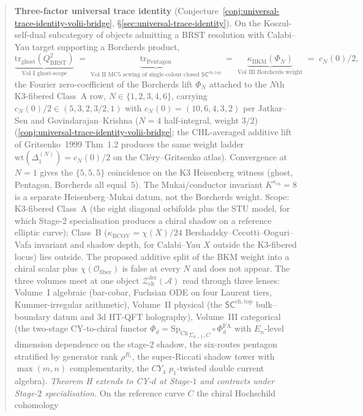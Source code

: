 \documentclass[11pt]{memoir}
\providecommand{\PhiFA}{\Phi^{\mathrm{FA}}}
\providecommand{\SpCh}{\mathrm{Sp}_{\mathrm{Ch}}}
\providecommand{\cref}[1]{\ref{#1}}
\newcommand{\cO}{\mathcal{O}}
\newcommand{\cA}{\mathcal{A}}
\providecommand{\cZ}{\mathcal{Z}}
\newcommand{\SCchtop}{{\mathsf{SC}^{\mathrm{ch,top}}}}
\providecommand{\PhiFA}{\Phi^{\mathrm{FA}}}
\providecommand{\SpCh}{\mathrm{Sp}^{\mathrm{ch}}}
\begin{document}
\begin{abstract}
\textbf{Three-factor universal trace identity}
(Conjecture~\ref{conj:universal-trace-identity-volii-bridge},
\S\ref{sec:universal-trace-identity}). On the Koszul-self-dual
subcategory of objects admitting a BRST resolution with
Calabi--Yau target supporting a Borcherds product,
\[
 \underbrace{\mathrm{tr}_{\mathrm{ghost}}(Q_{\mathrm{BRST}}^2)}_{\text{Vol~I ghost-scope}}
 \;=\;\underbrace{\mathrm{tr}_{\mathrm{Pentagon}}}_{\text{Vol~II MC5 sewing of single-colour closed $\SCchtop$}}
 \;=\;\underbrace{\kappa_{\mathrm{BKM}}(\Phi_N)}_{\text{Vol~III Borcherds weight}}
 \;=\;c_N(0)/2,
\]
the Fourier zero-coefficient of the Borcherds lift $\Phi_N$
attached to the $N$th K3-fibered Class~A row, $N \in \{1, 2, 3, 4, 6\}$,
carrying $c_N(0)/2 \in (5, 3, 2, 3/2, 1)$ with
$c_N(0) = (10, 6, 4, 3, 2)$ per Jatkar--Sen and
Govindarajan--Krishna ($N = 4$ half-integral, weight $3/2$)
(\cref{conj:universal-trace-identity-volii-bridge}; the
CHL-averaged additive lift of Gritsenko~1999 Thm~1.2 produces the
same weight ladder $\mathrm{wt}(\Delta_1^{(N)}) = c_N(0)/2$ on the
Cl\'ery--Gritsenko atlas).
Convergence at $N=1$ gives the $\{5,5,5\}$ coincidence on the
K3 Heisenberg witness (ghost, Pentagon, Borcherds all equal~$5$).
The Mukai/conductor invariant $K^{\kappa_{\mathrm{ch}}}=8$ is a
separate Heisenberg--Mukai datum, not the Borcherds weight.
Scope: K3-fibered Class~A (the eight diagonal orbifolds plus
the STU model, for which Stage-2 specialisation produces a
chiral shadow on a reference elliptic curve); Class~B
($\kappa_{\mathrm{BCOV}} = \chi(X)/24$ Bershadsky--Cecotti--Ooguri--Vafa
invariant and shadow depth, for Calabi--Yau $X$ outside
the K3-fibered locus) lies outside. The proposed additive split of
the BKM weight into a chiral scalar plus $\chi(\cO_{\mathrm{fiber}})$
is false at every $N$ and does not appear. The three volumes meet at one
object $\cZ^{\mathrm{der}}_{\mathrm{ch}}(\cA)$ read through
three lenses: Volume~I algebraic (bar-cobar, Fuchsian ODE on
four Laurent tiers, Kummer-irregular arithmetic),
Volume~II physical (the $\mathsf{SC}^{\mathrm{ch,top}}$ bulk--boundary datum and
$3$d HT-QFT holography), Volume~III categorical (the
two-stage CY-to-chiral functor
$\Phi_d = {\SpCh}_{\Sigma_{d-1},C}\circ\PhiFA_d$ with
$E_n$-level dimension dependence on the stage-2 shadow,
the six-routes pentagon stratified by generator rank
$\rho^{R_i}$, the super-Riccati shadow tower with $\max(m,n)$
complementarity, the $CY_4$ $p_1$-twisted double current
algebra). \emph{Theorem H extends to CY-$d$ at Stage-$1$ and contracts
under Stage-$2$ specialisation.}
On the reference curve $C$ the chiral Hochschild cohomology

\end{abstract}
\end{document}
